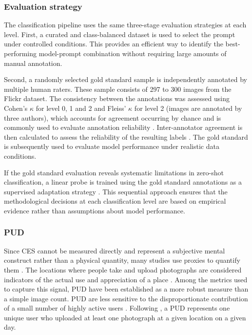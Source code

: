 \documentclass[11pt]{article}
\renewcommand{\_}{\textunderscore\allowbreak{}}
\begin{document}
\subsubsection{Evaluation strategy}
The classification pipeline uses the same three-stage evaluation strategies at each level. First, a curated and class-balanced dataset is used to select the prompt under controlled conditions. This provides an efficient way to identify the best-performing model-prompt combination without requiring large amounts of manual annotation.

Second, a randomly selected gold standard sample is independently annotated by multiple human raters. These sample consists of 297 to 300 images from the Flickr dataset. The consistency between the annotations was assessed using Cohen's $\kappa$ \citep{cohen_coefficient_1960} for level 0, 1 and 2 and Fleiss' $\kappa$ \citep{fleiss_measuring_1971} for level 2 (images are annotated by three authors), which accounts for agreement occurring by chance and is commonly used to evaluate annotation reliability \citep{artstein_survey_2008,cardoso_classifying_2022}. Inter-annotator agreement is then calculated to assess the reliability of the resulting labels \citep{artstein_survey_2008}. The gold standard is subsequently used to evaluate model performance under realistic data conditions.

If the gold standard evaluation reveals systematic limitations in zero-shot classification, a linear probe is trained using the gold standard annotations as a supervised adaptation strategy \citep{radford_learning_2021}. This sequential approach ensures that the methodological decisions at each classification level are based on empirical evidence rather than assumptions about model performance.



\subsubsection{PUD}
Since CES cannot be measured directly and represent a subjective mental construct rather than a physical quantity, many studies use proxies to quantify them \citep{wood_using_2013,ghermandi_geolocated_2022,liao_mapping_2025}. The locations where people take and upload photographs are considered indicators of the actual use and appreciation of a place \citep{wood_using_2013,ghermandi_geolocated_2022}. Among the metrics used to capture this signal, PUD have been established as a more robust measure than a simple image count. PUD are less sensitive to the disproportionate contribution of a small number of highly active users \citep{wood_using_2013}. Following \citet{wood_using_2013}, a PUD represents one unique user who uploaded at least one photograph at a given location on a given day.
\end{document}
